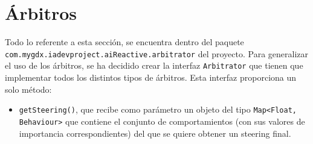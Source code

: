 \medskip
\section{Árbitros}
Todo lo referente a esta sección, se encuentra dentro del paquete \texttt{com.mygdx.iadevproject.aiReactive.arbitrator} del proyecto. Para generalizar el uso de los árbitros, se ha decidido crear la interfaz \texttt{Arbitrator} que tienen que implementar todos los distintos tipos de árbitros. Esta interfaz proporciona un solo método:
\begin{itemize}
 \item \texttt{getSteering()}, que recibe como parámetro un objeto del tipo \texttt{Map<Float, Behaviour>} que contiene el conjunto de comportamientos (con sus valores de importancia correspondientes) del que se quiere obtener un steering final. 
\end{itemize}


